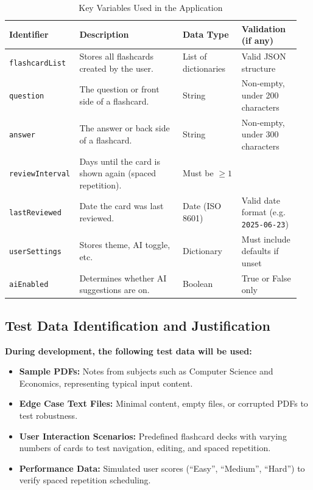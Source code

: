 \documentclass[a4paper,12pt]{article}
\begin{document}
\begin{table}[h]
\centering
\begin{tabular}{|>{\raggedright\arraybackslash}p{0.2\linewidth}|>{\raggedright\arraybackslash}p{0.35\linewidth}|>{\raggedright\arraybackslash}p{0.2\linewidth}|>{\raggedright\arraybackslash}p{0.2\linewidth}|}
\hline
\textbf{Identifier} & \textbf{Description} & \textbf{Data Type} & \textbf{Validation (if any)} \\
\hline
\texttt{flashcardList} & Stores all flashcards created by the user. & List of dictionaries & Valid JSON structure \\
\hline
\texttt{question} & The question or front side of a flashcard. & String & Non-empty, under 200 characters \\
\hline
\texttt{answer} & The answer or back side of a flashcard. & String & Non-empty, under 300 characters \\
\hline
\texttt{reviewInterval} & Days until the card is shown again (spaced repetition). & Must be \(\geq 1\) \\
\hline
\texttt{lastReviewed} & Date the card was last reviewed. & Date (ISO 8601) & Valid date format (e.g. \texttt{2025-06-23}) \\
\hline
\texttt{userSettings} & Stores theme, AI toggle, etc. & Dictionary & Must include defaults if unset \\
\hline
\texttt{aiEnabled} & Determines whether AI suggestions are on. & Boolean & True or False only \\
\hline
\end{tabular}
\caption{Key Variables Used in the Application}
\label{tab:keyvariables}
\end{table}

\subsection{Test Data Identification and Justification}

\textbf{During development, the following test data will be used:}

\begin{itemize}
  \item \textbf{Sample PDFs:} Notes from subjects such as Computer Science and Economics, representing typical input content.
  \item \textbf{Edge Case Text Files:} Minimal content, empty files, or corrupted PDFs to test robustness.
  \item \textbf{User Interaction Scenarios:} Predefined flashcard decks with varying numbers of cards to test navigation, editing, and spaced repetition.
  \item \textbf{Performance Data:} Simulated user scores (“Easy”, “Medium”, “Hard”) to verify spaced repetition scheduling.
\end{itemize}
\end{document}
